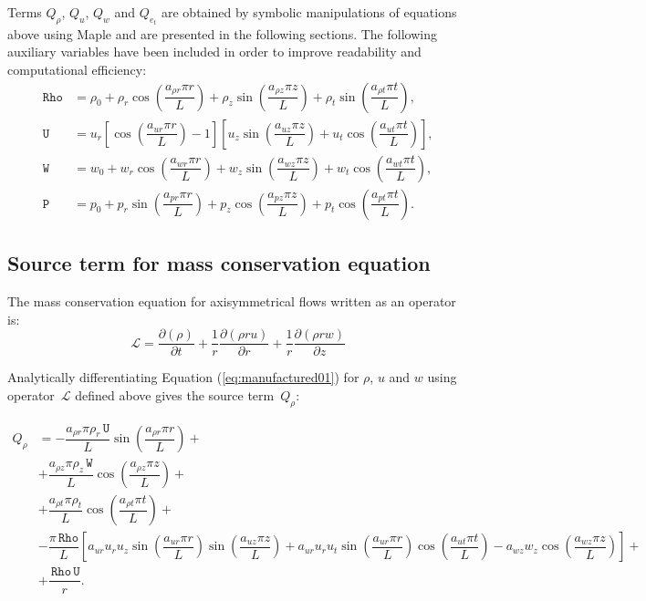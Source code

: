 \documentclass[10pt]{article}
\newcommand{\Diff}[2] {\dfrac{\partial( #1)}{\partial #2}}
\newcommand{\Lo}{\,\mathcal{L}}
\newcommand{\Rho}{\,\mathtt{Rho}}
\newcommand{\PP}{\,\mathtt{P}}
\newcommand{\U}{\,\mathtt{U}}
\newcommand{\W}{\,\mathtt{W}}
\begin{document}
Terms $Q_\rho$, $Q_u$,  $Q_w$ and $Q_{e_t}$ are obtained by symbolic manipulations of equations above using Maple and are presented in the following sections. The following auxiliary variables have been included in order to improve readability and computational efficiency:
\begin{equation*}
 \begin{split}
\label{eq:aux_}
\Rho &= \rho_0+\rho_r \cos\left(\dfrac{a_{\rho r} \pi r}{L}\right)+\rho_z \sin\left(\dfrac{a_{\rho z} \pi z}{L}\right)+\rho_t \sin\left(\dfrac{a_{\rho t} \pi t}{L}\right),\\
\U &= u_r  \left[\cos\left(\dfrac{a_{ur} \pi r}{L}\right)-1 \right] \left[u_z \sin\left(\dfrac{a_{uz} \pi z}{L}\right) + u_t\cos\left(\dfrac{a_{ut} \pi t}{L}\right) \right],\\
\W &=w_0+w_r \cos\left(\dfrac{a_{w r} \pi r}{L}\right)+w_z \sin\left(\dfrac{a_{w z} \pi z}{L}\right)+w_t \cos\left(\dfrac{a_{w t} \pi t}{L}\right),\\
\PP &=p_0+p_r \sin\left(\dfrac{a_{p r} \pi r}{L}\right)+p_z \cos\left(\dfrac{a_{p z} \pi z}{L}\right)+p_t \cos\left(\dfrac{a_{p t} \pi t}{L}\right).
\end{split}
\end{equation*}


\subsection{Source term for mass conservation equation}

The mass conservation equation for axisymmetrical flows written as an operator is:
\begin{equation*}
 \Lo=  \Diff{\rho}{t}+ \dfrac{1}{r} \Diff{\rho r u}{r}+ \dfrac{1}{r}\Diff{\rho r w}{z}
\end{equation*}

Analytically differentiating Equation (\ref{eq:manufactured01}) for $\rho$, $u$ and $w$ using operator $\Lo$ defined above gives  the source term~$Q_{\rho}$:

\begin{equation}
 \begin{split}
Q_\rho &= -\dfrac{a_{\rho r} \pi \rho_r \U }{L}\sin\left(\dfrac{a_{\rho r} \pi r}{L}\right)+ \\
&+\dfrac{a_{\rho z} \pi \rho_z \W }{L}\cos\left(\dfrac{a_{\rho z} \pi z}{L}\right)+ \\
&+\dfrac{a_{\rho t} \pi \rho_t }{L}\cos\left(\dfrac{a_{\rho t} \pi t}{L}\right)+ \\
&-\dfrac{\pi \Rho}{L}\left[ a_{ur} u_r u_z \sin\left(\dfrac{a_{ur} \pi r}{L}\right) \sin\left(\dfrac{a_{uz} \pi z}{L}\right)+a_{ur} u_r u_t \sin\left(\dfrac{a_{ur} \pi r}{L}\right) \cos\left(\dfrac{a_{ut} \pi t}{L}\right)-a_{wz} w_z \cos\left(\dfrac{a_{wz} \pi z}{L}\right)\right] + \\
&+\dfrac{\Rho \U}{r}.
\end{split}
\end{equation}
%
\end{document}
